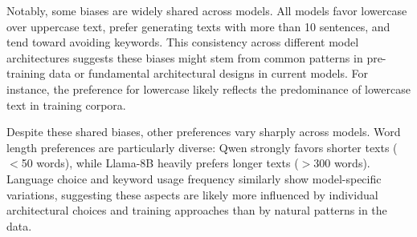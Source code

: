 Notably, some biases are widely shared across models. All models favor lowercase over uppercase text, prefer generating texts with more than 10 sentences, and tend toward avoiding keywords. This consistency across different model architectures suggests these biases might stem from common patterns in pre-training data or fundamental architectural designs in current models. For instance, the preference for lowercase likely reflects the predominance of lowercase text in training corpora.

Despite these shared biases, other preferences vary sharply across models. Word length preferences are particularly diverse: Qwen strongly favors shorter texts ($<$50 words), while Llama-8B heavily prefers longer texts ($>$300 words). Language choice and keyword usage frequency similarly show model-specific variations, suggesting these aspects are likely more influenced by individual architectural choices and training approaches than by natural patterns in the data.



